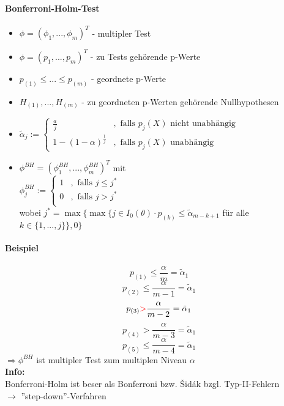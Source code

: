 \paragraph{Bonferroni-Holm-Test}
\begin{itemize}
 \item $\phi=(\phi_1,...,\phi_m)^T $ - multipler Test
 \item $\phi=(p_1,...,p_m)^T $ - zu Tests gehörende p-Werte
 \item $p_{(1)} \leq ... \leq p_{(m)} $ - geordnete p-Werte
 \item $H_{(1)},...,H_{(m)} $ - zu geordneten p-Werten gehörende Nullhypothesen
 \item $\tilde{\alpha}_j := 
	\begin{cases}
	 \frac{a}{j} & , \text{ falls } p_j(X) \text{ nicht unabhängig } \\
	 1-(1-\alpha)^{\frac{1}{j}} & , \text{ falls } p_j(X) \text{ unabhängig }
	\end{cases}
	$
 \item $\phi^{BH}=(\phi_1^{BH},...,\phi_m^{BH})^T$ mit \\
 $\phi_j^{BH} := 
      \begin{cases}
       1 & ,\text{ falls } j \leq j^* \\
       0 & ,\text{ falls } j > j^* \\
      \end{cases}
      $\\
      wobei $j^* =\max\{ \max\{j \in I_0(\theta) \cdot p_{(k)} \leq \tilde{\alpha}_{m-k+1}$ für alle $k \in \{1,...,j\}\}, 0 \}$
\end{itemize}
\paragraph{Beispiel}
\[ p_{(1)} \leq \frac{\alpha}{m} = \tilde{\alpha}_1 \]
\[ p_{(2)} \leq \frac{\alpha}{m-1} = \tilde{\alpha}_1 \]
\[ p_{(3)} \textcolor{red}{>} \frac{\alpha}{m-2} = \tilde{\alpha}_1 \]
\[ p_{(4)} > \frac{\alpha}{m-3} = \tilde{\alpha}_1 \]
\[ p_{(5)} \leq \frac{\alpha}{m-4} = \tilde{\alpha}_1 \]
$\Rightarrow \phi^{BH}$ ist multipler Test zum multiplen Niveau $\alpha$  \\
\textbf{Info:} \\
Bonferroni-Holm ist beser als Bonferroni bzw. \v Sid\'ak bzgl. Typ-II-Fehlern\\
$\rightarrow$ ''step-down''-Verfahren

